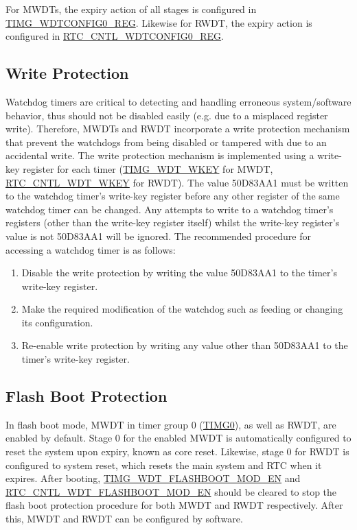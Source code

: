 \documentclass[main\_\_EN.tex]{subfiles}
\begin{document}
For MWDTs, the expiry action of all stages is configured in \hyperref[regdesc:TIMGWDTCONFIG0REG]{TIMG\_WDTCONFIG0\_REG}. Likewise for RWDT, the expiry action is configured in \hyperref[regdesc:RTCCNTLWDTCONFIG0REG]{RTC\_CNTL\_WDTCONFIG0\_REG}.

\subsection{Write Protection}
Watchdog timers are critical to detecting and handling erroneous system/software behavior, thus should not be disabled easily (e.g. due to a misplaced register write). Therefore, MWDTs and RWDT incorporate a write protection mechanism that prevent the watchdogs from being disabled or tampered with due to an accidental write.
The write protection mechanism is implemented using a write-key register for each timer (\hyperref[fielddesc:TIMGWDTWKEY]{TIMG\_WDT\_WKEY} for  MWDT, \hyperref[fielddesc:RTCCNTLWDTWKEY]{RTC\_CNTL\_WDT\_WKEY} for RWDT). The value \hexprefix{}50D83AA1 must be written to the watchdog timer’s write-key register before any other register of the same watchdog timer can be changed. Any attempts to write to a watchdog timer’s registers (other than the write-key register itself) whilst the write-key register’s value is not \hexprefix{}50D83AA1 will be ignored. The recommended procedure for accessing a watchdog timer is as follows:
\begin{enumerate}
\item Disable the write protection by writing the value \hexprefix{}50D83AA1 to the timer’s write-key register.
\item Make the required modification of the watchdog such as feeding or changing its configuration.
\item Re-enable write protection by writing any value other than \hexprefix{}50D83AA1 to the timer’s write-key register.
\end{enumerate}

\subsection{Flash Boot Protection}
In flash boot mode, MWDT in timer group 0 (\hyperref[TIMG0]{TIMG0}), as well as RWDT, are enabled by default. Stage 0 for the enabled MWDT is automatically configured to reset the system upon expiry, known as core reset. Likewise, stage 0 for RWDT is configured to system reset, which resets the main system and RTC when it expires. After booting, \hyperref[fielddesc:TIMGWDTFLASHBOOTMODEN]{TIMG\_WDT\_FLASHBOOT\_MOD\_EN} and \hyperref[fielddesc:RTCCNTLWDTFLASHBOOTMODEN]{RTC\_CNTL\_WDT\_FLASHBOOT\_MOD\_EN}  should be cleared to stop the flash boot protection procedure for both MWDT and RWDT respectively. After this, MWDT and RWDT can be configured by software.
\end{document}
